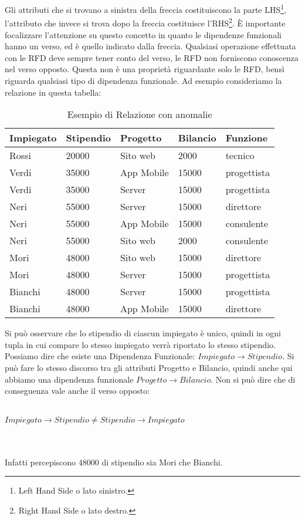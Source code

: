 \\~\\
Gli attributi che si trovano a sinistra della freccia costituiscono la parte LHS\footnote{Left Hand Side o lato sinistro.}, l'attributo che invece si trova dopo la freccia costituisce l'RHS\footnote{Right Hand Side o lato destro.}. 
È importante focalizzare l'attenzione su questo concetto in quanto le dipendenze funzionali hanno un verso, ed è quello indicato dalla freccia. Qualsiasi operazione effettuata con le RFD deve sempre tener conto del verso, le RFD non forniscono conoscenza nel verso opposto. Questa non è una proprietà riguardante solo le RFD, bensì riguarda qualsiasi tipo di dipendenza funzionale.
Ad esempio consideriamo la relazione in questa tabella:
\begin{table}[H]
	\centering
	\begin{tabular}{|l |l |l |l |l |}
		\hline
		Impiegato & Stipendio & Progetto & Bilancio & Funzione \\
		\hline
		Rossi & 20000  & Sito web & 2000 & tecnico\\
		Verdi & 35000 & App Mobile & 15000 & progettista\\
		Verdi & 35000 & Server & 15000 & progettista\\
		Neri & 55000 & Server & 15000 & direttore\\
		Neri & 55000 & App Mobile & 15000 & consulente\\
		Neri & 55000 & Sito web & 2000 & consulente\\
		Mori & 48000 & Sito web & 15000 & direttore\\
		Mori & 48000 & Server & 15000 & progettista\\
		Bianchi & 48000 & Server & 15000 & progettista\\
		Bianchi & 48000 & App Mobile & 15000 & direttore\\
		\hline
	\end{tabular}
	\caption{Esempio di Relazione con anomalie}
	\label{tab:relationship_anomalies}
\end{table}
Si può osservare che lo stipendio di ciascun impiegato è unico, quindi in ogni tupla in cui compare lo stesso impiegato verrà riportato lo stesso stipendio. Possiamo dire che esiste una Dipendenza Funzionale: 
$Impiegato \xrightarrow{} Stipendio$. 
Si può fare lo stesso discorso tra gli attributi Progetto e Bilancio, quindi anche qui abbiamo una dipendenza funzionale
$Progetto\xrightarrow{}Bilancio$. 
Non si può dire che di conseguenza vale anche il verso opposto:
\\~\\
\centerline{$Impiegato \xrightarrow{} Stipendio \neq Stipendio \xrightarrow{} Impiegato$} 
\\~\\
Infatti percepiscono 48000 di stipendio sia Mori che Bianchi.\cite{libroCeri}
